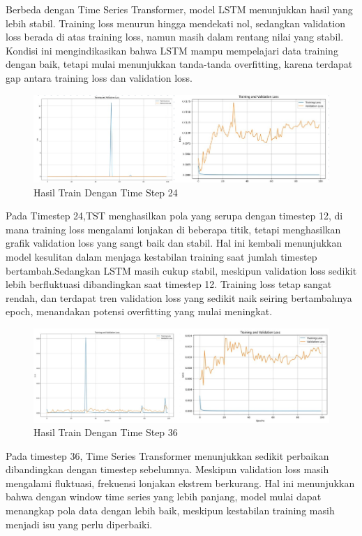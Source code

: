 Berbeda dengan Time Series Transformer, model LSTM menunjukkan hasil yang lebih stabil. Training loss menurun hingga mendekati nol, sedangkan validation loss berada di atas training loss, namun masih dalam rentang nilai yang stabil. Kondisi ini mengindikasikan bahwa LSTM mampu mempelajari data training dengan baik, tetapi mulai menunjukkan tanda-tanda overfitting, karena terdapat gap antara training loss dan validation loss.

\begin{figure} [H] \centering
    \includegraphics[scale=0.98]{gambar/perbandingan train(24).png} 
    \caption{Hasil Train Dengan Time Step 24}
    \label{fig:label_gambar}
\end{figure}

Pada Timestep 24,TST menghasilkan pola yang serupa dengan timestep 12, di mana training loss mengalami lonjakan di beberapa titik, tetapi menghasilkan grafik validation loss yang sangt baik dan stabil. Hal ini kembali menunjukkan model kesulitan dalam menjaga kestabilan training saat jumlah timestep bertambah.Sedangkan LSTM masih cukup stabil, meskipun validation loss sedikit lebih berfluktuasi dibandingkan saat timestep 12. Training loss tetap sangat rendah, dan terdapat tren validation loss yang sedikit naik seiring bertambahnya epoch, menandakan potensi overfitting yang mulai meningkat.


\begin{figure} [H] \centering
    \includegraphics[scale=0.75]{gambar/perbandingan train(36).png} 
    \caption{Hasil Train Dengan Time Step 36}
    \label{fig:label_gambar}
\end{figure}
Pada timestep 36, Time Series Transformer menunjukkan sedikit perbaikan dibandingkan dengan timestep sebelumnya. Meskipun validation loss masih mengalami fluktuasi, frekuensi lonjakan ekstrem berkurang. Hal ini menunjukkan bahwa dengan window time series yang lebih panjang, model mulai dapat menangkap pola data dengan lebih baik, meskipun kestabilan training masih menjadi isu yang perlu diperbaiki.

